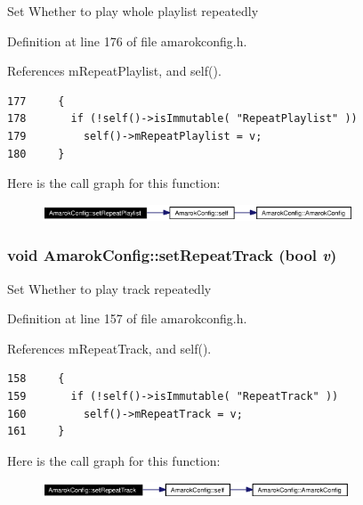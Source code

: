Set Whether to play whole playlist repeatedly 

Definition at line 176 of file amarokconfig.h.

References m\-Repeat\-Playlist, and self().



\footnotesize\begin{verbatim}177     {
178       if (!self()->isImmutable( "RepeatPlaylist" ))
179         self()->mRepeatPlaylist = v;
180     }
\end{verbatim}\normalsize 


Here is the call graph for this function:\begin{figure}[H]
\begin{center}
\leavevmode
\includegraphics[width=262pt]{classAmarokConfig_AmarokConfige17_cgraph}
\end{center}
\end{figure}
\subsubsection{\setlength{\rightskip}{0pt plus 5cm}void Amarok\-Config::set\-Repeat\-Track (bool {\em v})\hspace{0.3cm}{\tt  [inline, static]}}\label{classAmarokConfig_AmarokConfige15}


Set Whether to play track repeatedly 

Definition at line 157 of file amarokconfig.h.

References m\-Repeat\-Track, and self().



\footnotesize\begin{verbatim}158     {
159       if (!self()->isImmutable( "RepeatTrack" ))
160         self()->mRepeatTrack = v;
161     }
\end{verbatim}\normalsize 


Here is the call graph for this function:\begin{figure}[H]
\begin{center}
\leavevmode
\includegraphics[width=259pt]{classAmarokConfig_AmarokConfige15_cgraph}
\end{center}
\end{figure}

